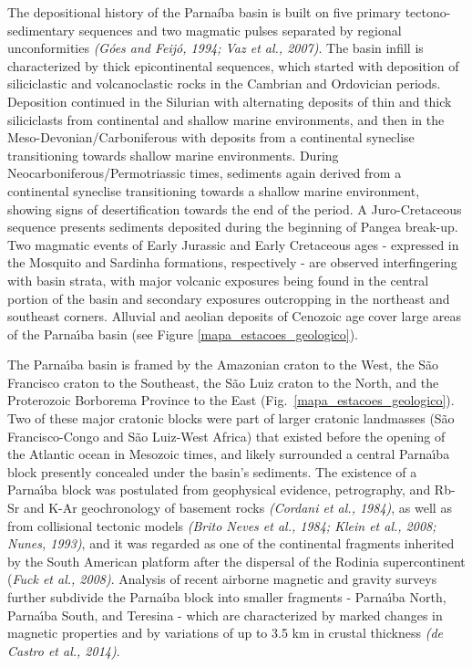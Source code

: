 \documentclass[manuscript,11pt]{geophysics}
\begin{document}
The depositional history of the Parnaíba basin is built on five primary tectono-sedimentary sequences and two magmatic pulses separated by regional unconformities \textit{(G\'oes and Feij\'o, 1994; Vaz et al., 2007)}. The basin infill is characterized by thick epicontinental sequences, which started with deposition of siliciclastic and volcanoclastic rocks in the Cambrian and Ordovician periods. Deposition continued in the Silurian with alternating deposits of thin and thick siliciclasts from continental and shallow marine environments, and then in the Meso-Devonian/Carboniferous with deposits from a continental syneclise transitioning towards shallow marine environments. During Neocarboniferous/Permotriassic times, sediments again derived from a continental syneclise transitioning towards a shallow marine environment, showing signs of desertification towards the end of the period. A Juro-Cretaceous sequence presents sediments deposited during the beginning of Pangea break-up. Two magmatic events of Early Jurassic and Early Cretaceous ages - expressed in the Mosquito and Sardinha formations, respectively - are observed interfingering with basin strata, with major volcanic exposures being found in the central portion of the basin and secondary exposures outcropping in the northeast and southeast corners. Alluvial and aeolian deposits of Cenozoic age cover large areas of the Parna\'{\i}ba basin (see Figure  \ref{mapa_estacoes_geologico}). 

The Parna\'{\i}ba basin is framed by the Amazonian craton to the West, the S\~ao Francisco craton to the Southeast, the S\~ao Luiz craton to the North, and the Proterozoic Borborema Province to the East (Fig.~\ref{mapa_estacoes_geologico}). Two of these major cratonic blocks were part of larger cratonic landmasses (S\~ao Francisco-Congo and S\~ao Luiz-West Africa) that existed before the opening of the Atlantic ocean in Mesozoic times, and likely surrounded a central Parna\'{\i}ba block presently concealed under the basin's sediments. The existence of a Parna\'{\i}ba block was postulated from geophysical evidence, petrography, and Rb-Sr and K-Ar geochronology of basement rocks \textit{(Cordani et al., 1984)}, as well as from collisional tectonic models \textit{(Brito Neves et al., 1984; Klein et al., 2008; Nunes, 1993)}, and it was regarded as one of the continental fragments inherited by the South American platform after the dispersal of the Rodinia supercontinent (\textit{Fuck et al., 2008)}. Analysis of recent airborne magnetic and gravity surveys further subdivide the Parna\'{\i}ba block into smaller fragments - Parna\'{\i}ba North, Parna\'{\i}ba South, and Teresina - which are characterized by marked changes in magnetic properties and by variations of up to 3.5 km in crustal thickness \textit{(de Castro et al., 2014)}.
\end{document}
